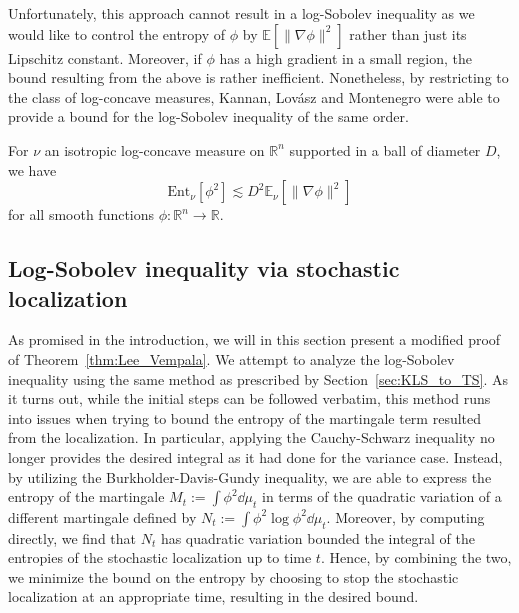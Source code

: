Unfortunately, this approach cannot result in a log-Sobolev inequality as we would like to control 
the entropy of \(\phi\) by \(\mathbb{E}[\|\nabla \phi\|^2]\) rather than just its Lipschitz constant.
Moreover, if \(\phi\) has a high gradient in a small region, the bound resulting from the above 
is rather inefficient. Nonetheless, by restricting to the class of log-concave measures, Kannan, Lovász and Montenegro 
\cite{Lovasz_2007} were able to provide a bound for the log-Sobolev inequality of the same order.

\begin{lemma}\label{lem:entropy_supp}
  For \(\nu\) an isotropic log-concave measure on \(\mathbb{R}^n\) supported in a ball of diameter \(D\), 
  we have
  \[\text{Ent}_\nu[\phi^2] \lesssim D^2 \mathbb{E}_\nu[\|\nabla \phi\|^2]\]
  for all smooth functions \(\phi : \mathbb{R}^n \to \mathbb{R}\).
\end{lemma}

\subsection{Log-Sobolev inequality via stochastic localization}

As promised in the introduction, we will in this section present a modified proof of Theorem~\ref{thm:Lee_Vempala}.
We attempt to analyze the log-Sobolev inequality using the same method as prescribed by Section~\ref{sec:KLS_to_TS}. 
As it turns out, while the initial steps can be followed verbatim, this method runs into issues when trying to 
bound the entropy of the martingale term resulted from the localization. In particular, applying the Cauchy-Schwarz 
inequality no longer provides the desired integral as it had done for the variance case. Instead, by 
utilizing the Burkholder-Davis-Gundy inequality, we are able to express the entropy of the martingale 
\(M_t := \int \phi^2 \dd \mu_t\) in terms of the quadratic 
variation of a different martingale defined by \(N_t := \int \phi^2 \log \phi^2 \dd \mu_t\). Moreover, 
by computing directly, we find that \(N_t\) has quadratic variation bounded the integral of the entropies of the 
stochastic localization up to time \(t\). Hence, by combining the two, we minimize the bound on the entropy by choosing to 
stop the stochastic localization at an appropriate time, resulting in the desired bound.

